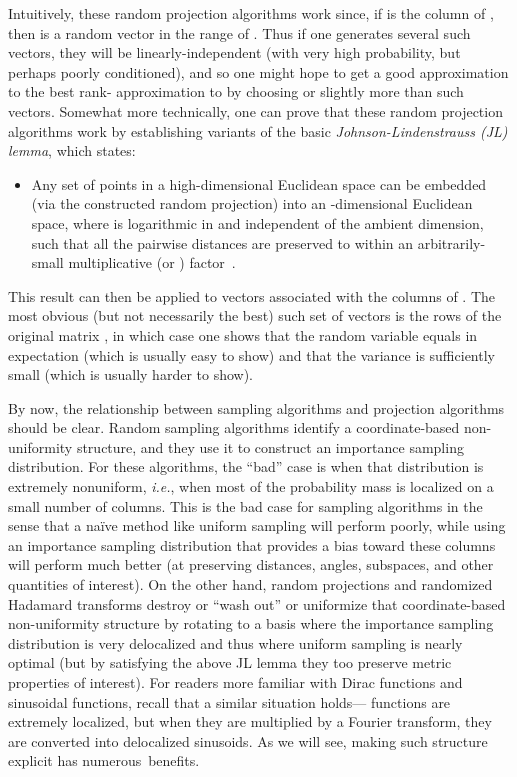 \documentclass[twoside]{article}
\begin{document}
Intuitively, these random projection algorithms work since, if 
 is the  column of , then  is a 
random vector in the range of .
Thus if one generates several such vectors, they will be 
linearly-independent (with very high probability, but perhaps poorly conditioned), and so one might hope 
to get a good approximation to the best rank- approximation to  by 
choosing  or slightly more than  such vectors.
Somewhat more technically, one can prove that these random projection 
algorithms work by establishing variants of the basic 
\emph{Johnson-Lindenstrauss (JL) lemma}, which states:
\begin{itemize}
\item
Any set of  points in a high-dimensional Euclidean space can be
embedded (via the constructed random projection) into an -dimensional 
Euclidean space, where  is logarithmic in  and independent of the 
ambient dimension, such that all the pairwise distances are preserved to 
within an arbitrarily-small 
multiplicative
(or )
factor~\cite{JL84,FH87,IM98,DG02,Ach03_JRNL,AC06,AC06-JRNL09,Matousek08_RSA}.
\end{itemize}
This result can then be applied to  vectors associated with 
the columns of .
The most obvious (but not necessarily the best) such set of vectors is the 
rows of the original matrix , in which case one shows that the random 
variable  equals 
 in expectation (which is usually easy to show) and that 
the variance is sufficiently small (which is usually harder to show).

By now, the relationship between sampling algorithms and projection 
algorithms should be clear.
Random sampling algorithms identify a coordinate-based non-uniformity 
structure, and they use it to construct an importance sampling distribution.
For these algorithms, the ``bad'' case is when that distribution is 
extremely nonuniform, \emph{i.e.}, when most of the probability mass is 
localized on a small number of columns.
This is the bad case for sampling algorithms in the sense that a na\"{i}ve
method like uniform sampling will perform poorly, while using an 
importance sampling distribution that provides a bias toward these columns 
will perform much better (at preserving distances, angles, subspaces, and
other quantities of interest).
On the other hand, random projections and randomized Hadamard transforms
destroy or ``wash out'' or uniformize that coordinate-based non-uniformity 
structure by rotating to a basis where the importance sampling distribution 
is very delocalized and thus where uniform sampling is nearly optimal (but 
by satisfying the above JL lemma they too preserve metric properties of 
interest).
For readers more familiar with Dirac  functions and sinusoidal 
functions, recall that a similar situation holds--- functions are 
extremely localized, but when they are multiplied by a Fourier transform, 
they are converted into delocalized sinusoids.
As we will see, making such structure explicit has numerous~benefits.
\end{document}
